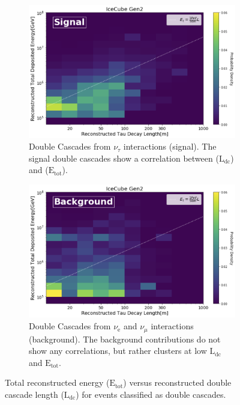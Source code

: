 \begin{figure}
\centering
\begin{subfigure}{.8\textwidth}
      \centering
      \includegraphics{./figures/gen2/Signal_PDF.png}
      \caption{Double Cascades from $\nu_{\tau}$ interactions (signal). The signal double cascades show a correlation between ($\mathrm{L}_{\mathrm{dc}}$) and ($\mathrm{E}_{\mathrm{tot}}$).}
\end{subfigure}
\begin{subfigure}{.8\textwidth}
      \centering
      \includegraphics{./figures/gen2/Bkg_PDF.png}
      \caption{Double Cascades from $\nu_{\mathrm{e}}$ and $\nu_{\mu}$ interactions (background). The background contributions do not show any correlations, but rather clusters at low $\mathrm{L}_{\mathrm{dc}}$ and $\mathrm{E}_{\mathrm{tot}}$.}
\end{subfigure}
\caption{Total reconstructed energy ($\mathrm{E}_{\mathrm{tot}}$) versus reconstructed double cascade length ($\mathrm{L}_{\mathrm{dc}}$) for events classified as double cascades.}
\end{figure}


